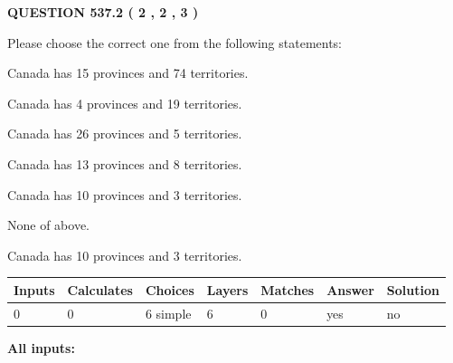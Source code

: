 \documentclass[12pt]{article}
\begin{document}
   
  
\vspace{0.2in}
  
{\textbf{\Large{QUESTION
537.2 
 ( 2 , 2 , 3 )
}}}
  
  
Please choose the correct one from the following statements:
 
 
Canada has  15 provinces and  74 territories.
 
 
Canada has   4 provinces and  19 territories.
 
 
Canada has  26 provinces and  5 territories.
 
 
Canada has  13 provinces and  8 territories.
 
 
Canada has 10  provinces and 3 territories.
 
 
 None of above.
 
 
\noindent{}
 
 
Canada has 10  provinces and 3 territories.
 
 
\noindent{}
 
 
   
   
   
   
\noindent\begin{tabular}{|l|l|l|l|l|l|l|}
 \hline
Inputs & Calculates & Choices & Layers & Matches & Answer & Solution \\ \hline
 0  & 
 0  & 
 6
  simple  
  & 
 6  & 
 0  & 
  yes & 
  no 
  \\ \hline
 \end{tabular}
   
   
   
   
\noindent{}
   
   
   
   
\noindent\vspace{0.1in}\hspace{-0.08in} {\textbf{\Large{All inputs: }}}
   
   
   
   
   
   
 \vspace{0.2in}
 
\end{document}
